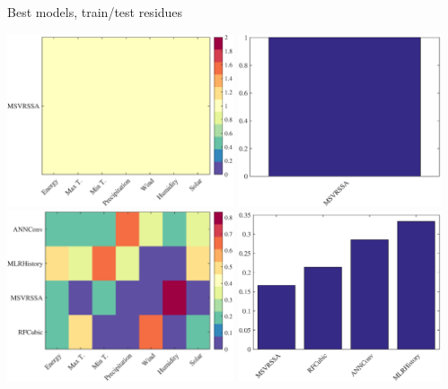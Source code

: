 \documentclass{beamer}
\begin{document}
\begin{frame}{Best models, train/test residues}

\includegraphics[width=0.5\textwidth]{fig/feature_selection/EnergyWeather/best_models_trainRes_colormatrix.eps}
\includegraphics[width=0.45\textwidth]{fig/feature_selection/EnergyWeather/best_models_trainRes_bar.eps}\\

\includegraphics[width=0.5\textwidth]{fig/feature_selection/EnergyWeather/best_models_testRes_colormatrix.eps}
\includegraphics[width=0.45\textwidth]{fig/feature_selection/EnergyWeather/best_models_testRes_bar.eps}\\

\end{frame}
\end{document}
